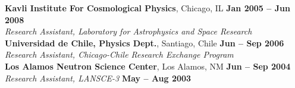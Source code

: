 \documentclass[margin,line]{resume}
\begin{document}
\begin{resume}
    \textbf{Kavli Institute For Cosmological Physics}, Chicago, IL \hfill \textbf{Jan 2005 -- Jun 2008}\\
                \textsl{Research Assistant, Laboratory for Astrophysics and 
                Space Research}\vspace{2mm}\\
    \textbf{Universidad de Chile, Physics Dept.}, Santiago, Chile \hfill \textbf{Jun -- Sep 2006}\\
                \textsl{Research Assistant, Chicago-Chile Research Exchange 
                Program}\vspace{2mm}\\
    \textbf{Los Alamos Neutron Science Center}, Los Alamos, NM \hfill \textbf{Jun -- Sep 2004}\\
                \textsl{Research Assistant, LANSCE-3} \hfill \textbf{May -- Aug 
                2003}
    \vspace{-4mm}

\end{resume}
\end{document}
